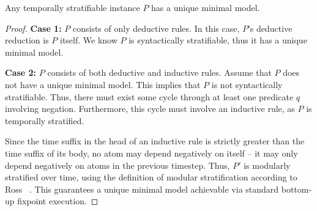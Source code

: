 \begin{lemma}
\label{lemma:temp-strat-uniq}
%
Any temporally stratifiable \slang instance $P$ has a unique minimal model.
%
\end{lemma} 

\begin{proof}
%
{\bf Case 1:} $P$ consists of only deductive rules.  In this case, $P$'s
deductive reduction is $P$ itself.  We know $P$ is syntactically stratifiable,
thus it has a unique minimal model.

{\bf Case 2:} $P$ consists of both deductive and inductive rules.  Assume that
$P$ does not have a unique minimal model.  This implies that $P$ is not
syntactically stratifiable.  Thus, there must exist some cycle through at least
one predicate $q$ involving negation.
Furthermore, this cycle must involve an inductive rule, as $P$ is temporally
stratified.

Since the time suffix in the head of an inductive rule is strictly greater than
the time suffix of its body, no atom may depend negatively on itself -- it may
only depend negatively on atoms in the previous timestep.  Thus, $P'$ is
modularly stratified over time, using the definition of modular stratification
according to Ross \etal~\cite{modular}.  This guarantees a unique minimal model
achievable via standard bottom-up fixpoint execution.
%
%
\end{proof}


